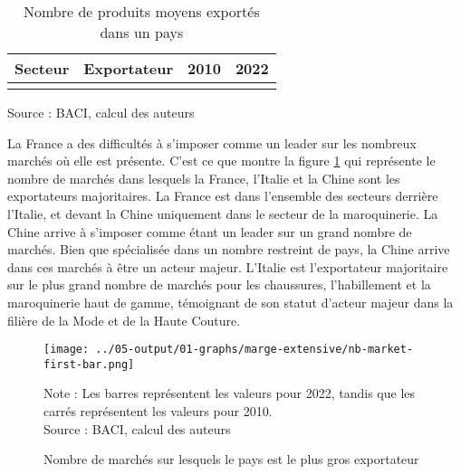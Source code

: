 \documentclass[french,10pt,a4paper]{article}
\begin{document}
\begin{table}[ht]
  \centering
  \begin{tabular}{|c|c|c|c|}
    \hline
   Secteur & Exportateur & 2010 & 2022 \\
    \hline
    \\
    \hline
  \end{tabular}
  \captionsetup{justification=raggedright,singlelinecheck=false, font=small}
  \caption*{Source : BACI, calcul des auteurs}
  \captionsetup{justification=centering, singlelinecheck=true, font=normalsize}
  \caption{Nombre de produits moyens exportés dans un pays}
  \label{tab:table-nb-mean-product-export}
\end{table}

La France a des difficultés à s'imposer comme un leader sur les nombreux marchés où elle est présente. C'est ce que montre la figure \ref{fig:nb-market-first-bar} qui représente le nombre de marchés dans lesquels la France, l'Italie et la Chine sont les exportateurs majoritaires. La France est dans l'ensemble des secteurs derrière l'Italie, et devant la Chine uniquement dans le secteur de la maroquinerie. La Chine arrive à s'imposer comme étant un leader sur un grand nombre de marchés. Bien que spécialisée dans un nombre restreint de pays, la Chine arrive dans ces marchés à être un acteur majeur. L'Italie est l'exportateur majoritaire sur le plus grand nombre de marchés pour les chaussures, l'habillement et la maroquinerie haut de gamme, témoignant de son statut d'acteur majeur dans la filière de la Mode et de la Haute Couture.


\begin{figure}[!h]
  \centering  \texttt{[image: ../05-output/01-graphs/marge-extensive/nb-market-first-bar.png]}
  \captionsetup{justification=justified, singlelinecheck=false, font=small}
  \caption*{Note : Les barres représentent les valeurs pour 2022, tandis que les carrés représentent les valeurs pour 2010. \\
  Source : BACI, calcul des auteurs}
  \captionsetup{justification=centering, singlelinecheck=true, font=normalsize}
  \caption{Nombre de marchés sur lesquels le pays est le plus gros exportateur}
  \label{fig:nb-market-first-bar}
\end{figure}
\end{document}

